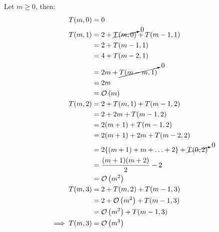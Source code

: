 \documentclass[answers]{exam}
\renewcommand{\O}[1]{\mathcal{O}\left(#1\right)}
\begin{document}
\begin{questions}
\begin{parts}
\begin{solution}
\begin{itemize}
{\begin{itemize}
{                                Let \(m \geq 0\), then:
                                \begin{align*}
                                    T(m, 0) &= 0 \\
                                    T(m, 1) &= 2 + \cancelto{0}{T(m, 0)} + T(m - 1, 1) \\
                                        &= 2 + T(m - 1, 1) \\
                                        &= 4 + T(m - 2, 1) \\
                                        &= 2m + \cancelto{0}{T(m - m, 1)} \\
                                        &= 2m \\
                                        &= \O{m} \\
                                    T(m, 2) &= 2 + T(m, 1) + T(m - 1, 2)\\
                                        &= 2 + 2m + T(m - 1, 2)\\
                                        &= 2(m + 1) + T(m - 1, 2)\\
                                        &= 2(m + 1) + 2m + T(m - 2, 2)\\
                                        &= 2\{(m + 1) + m + \ldots + 2\} + \cancelto{0}{T(0, 2)}\\
                                        &= \frac{(m + 1)(m + 2)}{2} - 2\\
                                        &= \O{m^2}\\
                                    T(m, 3) &= 2 + T(m, 2) + T(m - 1, 3)\\
                                        &= 2 + \O{m^2} + T(m - 1, 3)\\
                                        &= \O{m^2} + T(m - 1, 3)\\
                                    \implies T(m, 3) &= \O{m^3}
                                \end{align*}

}
\end{itemize}}
\end{itemize}
\end{solution}
\end{parts}
\end{questions}
\end{document}
